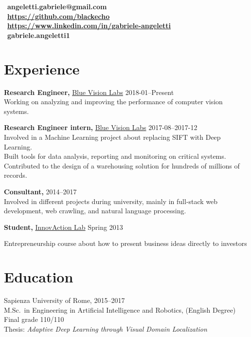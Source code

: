 \documentclass[margin]{res}
\begin{document}
    \address{London, UK  \\ (+44) 7803 056685}
    \begin{resume}
        \section{}
        \faEnvelope~\textbf{angeletti.gabriele@gmail.com} \\[5pt]
        \faGithub~\textbf{\url{https://github.com/blackecho}} \\[5pt]
        \faLinkedin~\textbf{\url{https://www.linkedin.com/in/gabriele-angeletti}} \\[5pt]
        \faSkype~\textbf{gabriele.angeletti1}

        \section{Experience}
            {\bf Research Engineer,} \href{http://www.bluevisionlabs.com}{Blue Vision Labs} \hfill 2018-01--Present\\
            Working on analyzing and improving the performance of computer vision systems.

            {\bf Research Engineer intern,} \href{http://www.bluevisionlabs.com}{Blue Vision Labs} \hfill 2017-08--2017-12\\
            Involved in a Machine Learning project about replacing SIFT with Deep Learning.\\
	        Built tools for data analysis, reporting and monitoring on critical systems.\\
	        Contributed to the design of a warehousing solution for hundreds of millions of records.

            {\bf Consultant,} \hfill 2014--2017\\
            Involved in different projects during university, mainly in full-stack web development,
            web crawling, and natural language processing.

            {\bf Student,} \href{http://www.innovactionlab.org/?lang=en}{InnovAction Lab} \hfill Spring 2013\\
            \item Entrepreneurship course about how to present business ideas directly to investors

        \section{Education}
            Sapienza University of Rome, \hfill 2015--2017 \\
            M.Sc.\ in Engineering in Artificial Intelligence and Robotics, (English Degree) \\
            Final grade 110/110 \\
            Thesis: \textit{Adaptive Deep Learning through Visual Domain Localization}


\end{resume}
\end{document}
